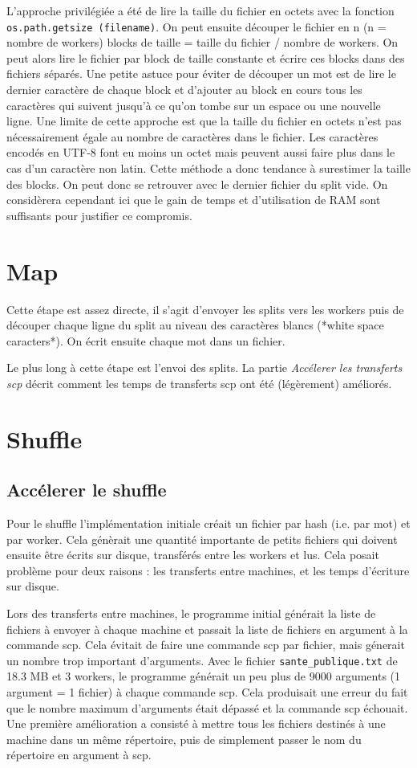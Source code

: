 \documentclass[11pt,a4paper]{article}
\begin{document}
L'approche privilégiée a été de lire la taille du fichier en octets avec la fonction \texttt{os.path.getsize (filename)}. On peut ensuite découper le fichier en n (n = nombre de workers) blocks de taille = taille du fichier / nombre de workers. On peut alors lire le fichier par block de taille constante et écrire ces blocks dans des fichiers séparés. Une petite astuce pour éviter de découper un mot est de lire le dernier caractère de chaque block et d'ajouter au block en cours tous les caractères qui suivent jusqu'à ce qu'on tombe sur un espace ou une nouvelle ligne. Une limite de cette approche est que la taille du fichier en octets n'est pas nécessairement égale au nombre de caractères dans le fichier. Les caractères encodés en UTF-8 font eu moins un octet mais peuvent aussi faire plus dans le cas d'un caractère non latin. Cette méthode a donc tendance à surestimer la taille des blocks. On peut donc se retrouver avec le dernier fichier du split vide. On considèrera cependant ici que le gain de temps et d'utilisation de RAM sont suffisants pour justifier ce compromis.

\section{Map}
Cette étape est assez directe, il s'agit d'envoyer les splits vers les workers puis de découper chaque ligne du split au niveau des caractères blancs (*white space caracters*). On écrit ensuite chaque mot dans un fichier.

Le plus long à cette étape est l'envoi des splits. La partie \textit{Accélerer les transferts scp} décrit comment les temps de transferts scp ont été (légèrement) améliorés.

\section{Shuffle}
\subsection*{Accélerer le shuffle}
Pour le shuffle l'implémentation initiale créait un fichier par hash (i.e. par mot) et par worker. Cela génèrait une quantité importante de petits fichiers qui doivent ensuite être écrits sur disque, transférés entre les workers et lus. Cela posait problème pour deux raisons : les transferts entre machines, et les temps d'écriture sur disque.

Lors des transferts entre machines, le programme initial générait la liste de fichiers à envoyer à chaque machine et passait la liste de fichiers en argument à la commande scp. Cela évitait de faire une commande scp par fichier, mais génerait un nombre trop important d'arguments. Avec le fichier \verb|sante_publique.txt| de 18.3 MB et 3 workers, le programme générait un peu plus de 9000 arguments (1 argument = 1 fichier) à chaque commande scp. Cela produisait une erreur du fait que le nombre maximum d'arguments était dépassé et la commande scp échouait. Une première amélioration a consisté à mettre tous les fichiers destinés à une machine dans un même répertoire, puis de simplement passer le nom du répertoire en argument à scp. 
\end{document}
